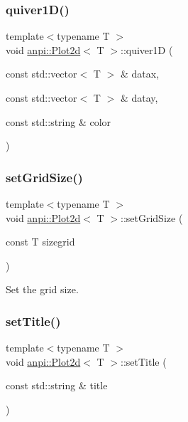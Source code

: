 \mbox{\label{classanpi_1_1Plot2d_ad70dc094e12bc263dc196c1b96656f47}} 
\subsubsection{\texorpdfstring{quiver1\+D()}{quiver1D()}}
{\footnotesize\ttfamily template$<$typename T $>$ \\
void \hyperlink{classanpi_1_1Plot2d}{anpi\+::\+Plot2d}$<$ T $>$\+::quiver1D (\begin{DoxyParamCaption}\item[{const std\+::vector$<$ T $>$ \&}]{datax,  }\item[{const std\+::vector$<$ T $>$ \&}]{datay,  }\item[{const std\+::string \&}]{color }\end{DoxyParamCaption})}

\mbox{\label{classanpi_1_1Plot2d_a24be2607e97fdf82267c53f1cdc1c620}} 
\subsubsection{\texorpdfstring{set\+Grid\+Size()}{setGridSize()}}
{\footnotesize\ttfamily template$<$typename T $>$ \\
void \hyperlink{classanpi_1_1Plot2d}{anpi\+::\+Plot2d}$<$ T $>$\+::set\+Grid\+Size (\begin{DoxyParamCaption}\item[{const T}]{sizegrid }\end{DoxyParamCaption})}



Set the grid size. 

\mbox{\label{classanpi_1_1Plot2d_a4346f9f252a2637696ef94ce3755d04a}} 
\subsubsection{\texorpdfstring{set\+Title()}{setTitle()}}
{\footnotesize\ttfamily template$<$typename T $>$ \\
void \hyperlink{classanpi_1_1Plot2d}{anpi\+::\+Plot2d}$<$ T $>$\+::set\+Title (\begin{DoxyParamCaption}\item[{const std\+::string \&}]{title }\end{DoxyParamCaption})}




